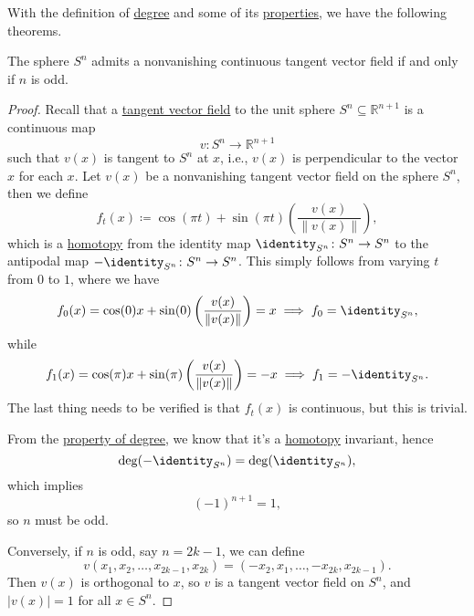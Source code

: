 With the definition of \hyperref[def:degree]{degree} and some of its \hyperref[rmk:property-of-degree]{properties}, we have the following theorems.
\begin{theorem}\label{thm:hairy-ball-theorem}
	The sphere \(S^n\) admits a nonvanishing continuous tangent vector field if and only if \(n\) is odd.
\end{theorem}
\begin{proof}
	Recall that a \underline{tangent vector field} to the unit sphere \(S^n\subseteq \mathbb{R} ^{n+1}\) is a continuous map
	\[
		v \colon S^n \to \mathbb{R} ^{n+1}
	\]
	such that \(v(x)\) is tangent to \(S^n\) at \(x\), i.e., \(v(x)\) is perpendicular to the vector \(x\) for each \(x\). Let \(v(x)\) be a
	nonvanishing tangent vector field on the sphere \(S^n\), then we define
	\[
		f_t(x) \coloneqq \cos (\pi t) + \sin (\pi t)\left(\frac{v(x)}{\left\lVert v(x)\right\rVert }\right),
	\]
	which is a \hyperref[def:homotopy]{homotopy} from the identity map \(\identity_{S^n}\colon S^n \to S^n \) to the antipodal map
	\(-\identity_{S^n}\colon S^{n}\to S^n\). This simply follows from varying \(t\) from \(0\) to \(1\), where we have
	\[
		f_0(x) = \cos (0) x + \sin (0) \left(\frac{v(x)}{\left\lVert v(x)\right\rVert }\right) = x \implies f_0 = \identity_{S^n} ,
	\]
	while
	\[
		f_1(x) = \cos (\pi )x + \sin (\pi )\left(\frac{v(x)}{\left\lVert v(x)\right\rVert }\right) = - x \implies f_{1} = - \identity_{S^n}.
	\]
	The last thing needs to be verified is that \(f_t(x)\) is continuous, but this is trivial.


	From the \hyperref[rmk:property-of-degree]{property of degree}, we know that it's a \hyperref[def:homotopy]{homotopy} invariant, hence
	\[
		\deg (-\identity_{S^n}) = \deg (\identity_{S^n} ),
	\]
	which implies
	\[
		(-1)^{n+1} = 1,
	\]
	so \(n\) must be odd.

	Conversely, if \(n\) is odd, say \(n=2k-1\), we can define
	\[
		v(x_1, x_2, \dots , x_{2k-1}, x_{2k})= (-x_2, x_1, \dots , -x_{2k}, x_{2k-1}).
	\]
	Then \(v(x)\) is orthogonal to \(x\), so \(v\) is a tangent vector field on \(S^n\), and \(\left\vert v(x) \right\vert = 1\) for all \(x\in S^n\).
\end{proof}

